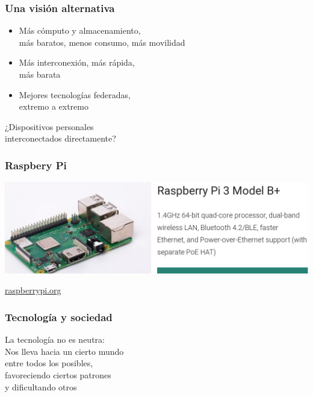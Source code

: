 \documentclass[17pt,aspectratio=169]{beamer}
\begin{document}

\begin{frame}
\frametitle{Una visión alternativa}

\begin{itemize}
\item Más cómputo y almacenamiento, \\
  más baratos, menos consumo, más movilidad \\
\item Más interconexión, más rápida, \\
  más barata \\
\item Mejores tecnologías federadas, \\
  extremo a extremo \\
\end{itemize}

  \begin{flushright}
  ¿Dispositivos personales \\
  interconectados directamente? \\
  \end{flushright}

\end{frame}


\begin{frame}
\frametitle{Raspbery Pi}

\includegraphics[width=\linewidth]{figs/raspberry-pi}

\begin{flushright}
\href{https://raspberrypi.org}{raspberrypi.org}
\end{flushright}

\end{frame}


\begin{frame}
\frametitle{Tecnología y sociedad}

{\Large
La tecnología no es neutra: \\
Nos lleva hacia un cierto mundo \\
entre todos los posibles, \\
favoreciendo ciertos patrones \\
y dificultando otros \\
}

\end{frame}
\end{document}
